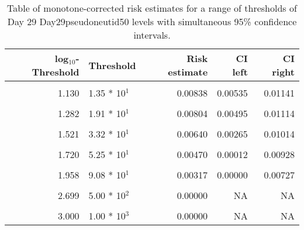 \documentclass[]{article}
\begin{document}
\begin{table}[!h]

\caption{\label{tab:unnamed-chunk-68}Table of monotone-corrected risk estimates for a range of thresholds of Day 29 Day29pseudoneutid50 levels with simultaneous 95\% confidence intervals.}
\centering
\begin{tabular}[t]{rlrrr}
\toprule
log$_{10}$-Threshold & Threshold & Risk estimate & CI left & CI right\\
\midrule
\cellcolor{gray!6}{0.083} & \cellcolor{gray!6}{1.21 * 10$^{0}$} & \cellcolor{gray!6}{0.00875} & \cellcolor{gray!6}{0.00588} & \cellcolor{gray!6}{0.01162}\\
1.130 & 1.35 * 10$^{1}$ & 0.00838 & 0.00535 & 0.01141\\
\cellcolor{gray!6}{1.204} & \cellcolor{gray!6}{1.60 * 10$^{1}$} & \cellcolor{gray!6}{0.00838} & \cellcolor{gray!6}{0.00531} & \cellcolor{gray!6}{0.01145}\\
1.282 & 1.91 * 10$^{1}$ & 0.00804 & 0.00495 & 0.01114\\
\cellcolor{gray!6}{1.423} & \cellcolor{gray!6}{2.65 * 10$^{1}$} & \cellcolor{gray!6}{0.00678} & \cellcolor{gray!6}{0.00368} & \cellcolor{gray!6}{0.00989}\\
1.521 & 3.32 * 10$^{1}$ & 0.00640 & 0.00265 & 0.01014\\
\cellcolor{gray!6}{1.613} & \cellcolor{gray!6}{4.10 * 10$^{1}$} & \cellcolor{gray!6}{0.00579} & \cellcolor{gray!6}{0.00150} & \cellcolor{gray!6}{0.01008}\\
1.720 & 5.25 * 10$^{1}$ & 0.00470 & 0.00012 & 0.00928\\
\cellcolor{gray!6}{1.891} & \cellcolor{gray!6}{7.78 * 10$^{1}$} & \cellcolor{gray!6}{0.00403} & \cellcolor{gray!6}{0.00000} & \cellcolor{gray!6}{0.00915}\\
1.958 & 9.08 * 10$^{1}$ & 0.00317 & 0.00000 & 0.00727\\
\cellcolor{gray!6}{2.047} & \cellcolor{gray!6}{1.11 * 10$^{2}$} & \cellcolor{gray!6}{0.00287} & \cellcolor{gray!6}{0.00000} & \cellcolor{gray!6}{0.00607}\\
2.699 & 5.00 * 10$^{2}$ & 0.00000 & NA & NA\\
\cellcolor{gray!6}{2.828} & \cellcolor{gray!6}{6.73 * 10$^{2}$} & \cellcolor{gray!6}{0.00000} & \cellcolor{gray!6}{NA} & \cellcolor{gray!6}{NA}\\
3.000 & 1.00 * 10$^{3}$ & 0.00000 & NA & NA\\
\bottomrule
\end{tabular}
\end{table}
\end{document}
